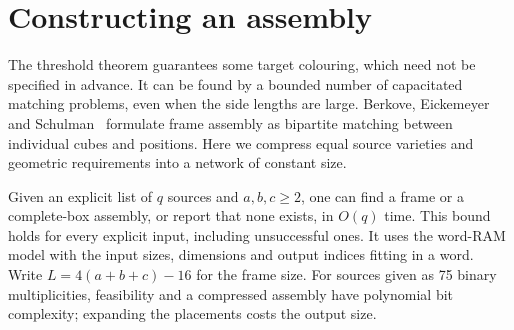 \section{Constructing an assembly}\label{sec:construction}
The threshold theorem guarantees some target colouring, which need not be
specified in advance. It can be found by a bounded number of capacitated
matching problems, even when the side lengths are large.
Berkove, Eickemeyer and Schulman~\cite[Section 7]{BES} formulate frame
assembly as bipartite matching between individual cubes and positions.
Here we compress equal source varieties and geometric requirements into
a network of constant size.

\begin{proposition}\label{prop:construction}
Given an explicit list of $q$ sources and $a,b,c\ge2$, one can find a
frame or a complete-box assembly, or report that none exists, in $O(q)$ time.
This bound holds for every explicit input, including unsuccessful ones.
It uses the word-RAM model with the input sizes, dimensions and output
indices fitting in a word. Write $L=4(a+b+c)-16$ for the frame size.
For sources given as 75 binary multiplicities, feasibility and a compressed
assembly have polynomial bit complexity; expanding the placements costs
the output size.
\end{proposition}

